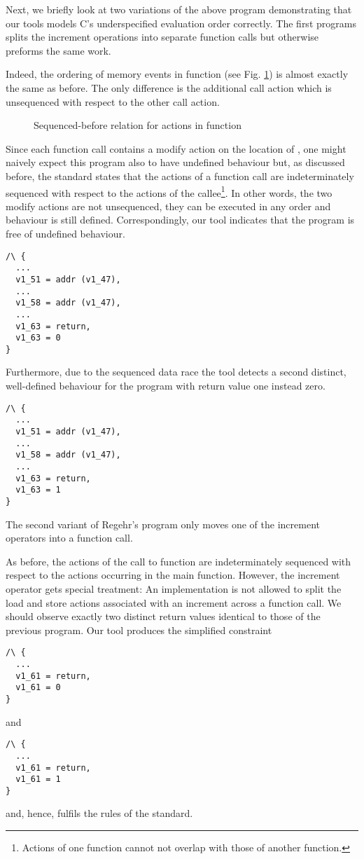 \documentclass[a4paper,12pt]{scrbook}
\theoremstyle{plain}
\theoremstyle{definition}
\newcommand{\cc}[1]{{\text{\footnotesize\ttfamily{#1}}}}
\begin{document}
Next, we briefly look at two variations of the above program
demonstrating that our tools models C's underspecified evaluation order
correctly. The first programs splits the increment operations into separate
function calls but otherwise preforms the same work.


Indeed, the ordering of memory events in function \cc{main} (see
Fig. \ref{ptrFgMain}) is almost exactly the same as before. The only difference
is the additional call action which is unsequenced with respect to the other
call action.
\begin{figure}[htb]
\centering
\caption{Sequenced-before relation for actions in function \cc{main}}
\label{ptrFgMain}
\end{figure}
Since each function call contains a modify action on the location of \cc{x}, one
might naively expect this program also to have undefined behaviour but, as
discussed before, the standard states that the actions of a function call are
indeterminately sequenced with respect to the actions of the
callee\footnote{Actions of one function cannot not overlap with those of another
  function.}. In other words, the two modify actions are not unsequenced, they
can be executed in any order and behaviour is still defined. Correspondingly,
our tool indicates that the program is free of undefined behaviour.
\begin{lstlisting}
/\ {
  ...
  v1_51 = addr (v1_47),
  ...
  v1_58 = addr (v1_47),
  ...
  v1_63 = return,
  v1_63 = 0
}
\end{lstlisting}
Furthermore, due to the sequenced data race the tool detects a second distinct,
well-defined behaviour for the program with return value one instead zero.
\begin{lstlisting}
/\ {
  ...
  v1_51 = addr (v1_47),
  ...
  v1_58 = addr (v1_47),
  ...
  v1_63 = return,
  v1_63 = 1
}
\end{lstlisting}

The second variant of Regehr's program only moves one of the
increment operators into a function call.  

As before, the actions of the call to function \cc{f} are indeterminately
sequenced with respect to the actions occurring in the main function. However,
the increment operator gets special treatment: An implementation is not allowed
to split the load and store actions associated with an increment across a
function call. We should observe exactly two distinct return values identical to
those of the previous program. Our tool produces the simplified constraint
\begin{lstlisting}
/\ {
  ...
  v1_61 = return,
  v1_61 = 0
}
\end{lstlisting}
and
\begin{lstlisting}
/\ {
  ...
  v1_61 = return,
  v1_61 = 1
}
\end{lstlisting}
and, hence, fulfils the rules of the standard.
\end{document}
